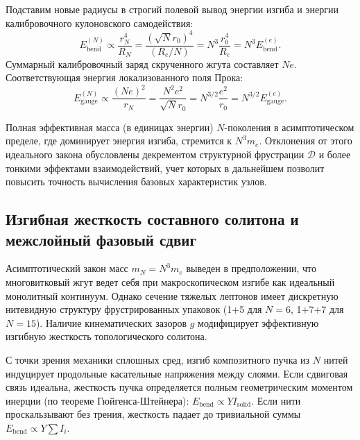 \documentclass[11pt,a4paper]{article}
\begin{document}
	Подставим новые радиусы в строгий полевой вывод энергии изгиба и энергии калибровочного кулоновского самодействия:
	\begin{equation}
		E_{\text{bend}}^{(N)} \propto \frac{r_N^4}{R_N} = \frac{(\sqrt{N} r_0)^4}{(R_e / N)} = N^3 \frac{r_0^4}{R_e} = N^3 E_{\text{bend}}^{(e)}.
	\end{equation}
	Суммарный калибровочный заряд скрученного жгута составляет $N e$. Соответствующая энергия локализованного поля Прока:
	\begin{equation}
		E_{\text{gauge}}^{(N)} \propto \frac{(Ne)^2}{r_N} = \frac{N^2 e^2}{\sqrt{N} r_0} = N^{3/2} \frac{e^2}{r_0} = N^{3/2} E_{\text{gauge}}^{(e)}.
	\end{equation}
	
	Полная эффективная масса (в единицах энергии) $N$-поколения в асимптотическом пределе, где доминирует энергия изгиба, стремится к $N^3 m_e$. Отклонения от этого идеального закона обусловлены декрементом структурной фрустрации $\mathcal{D}$ и более тонкими эффектами взаимодействий, учет которых в дальнейшем позволит повысить точность вычисления базовых характеристик узлов.
	
	\subsection{Изгибная жесткость составного солитона и межслойный фазовый сдвиг}
	Асимптотический закон масс $m_N = N^3 m_e$ выведен в предположении, что многовитковый жгут ведет себя при макроскопическом изгибе как идеальный монолитный континуум. Однако сечение тяжелых лептонов имеет дискретную нитевидную структуру фрустрированных упаковок (1+5 для $N=6$, 1+7+7 для $N=15$). Наличие кинематических зазоров $g$ модифицирует эффективную изгибную жесткость топологического солитона.
	
	С точки зрения механики сплошных сред, изгиб композитного пучка из $N$ нитей индуцирует продольные касательные напряжения между слоями. Если сдвиговая связь идеальна, жесткость пучка определяется полным геометрическим моментом инерции (по теореме Гюйгенса-Штейнера): $E_{\text{bend}} \propto Y I_{\text{solid}}$. Если нити проскальзывают без трения, жесткость падает до тривиальной суммы $E_{\text{bend}} \propto Y \sum I_i$.
	
\end{document}
